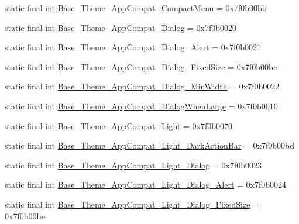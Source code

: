 \begin{CompactItemize}
\item 
static final int \hyperlink{classandroid_1_1support_1_1graphics_1_1drawable_1_1animated_1_1_r_1_1style_fb4b49c45164e8f37a20fc40da3d119b}{Base\_\-Theme\_\-AppCompat\_\-CompactMenu} = 0x7f0b00bb
\item 
static final int \hyperlink{classandroid_1_1support_1_1graphics_1_1drawable_1_1animated_1_1_r_1_1style_34fb42981b6fef358d1179c600223d95}{Base\_\-Theme\_\-AppCompat\_\-Dialog} = 0x7f0b0020
\item 
static final int \hyperlink{classandroid_1_1support_1_1graphics_1_1drawable_1_1animated_1_1_r_1_1style_d64f58d2f9e213f4c623315ff9ce6192}{Base\_\-Theme\_\-AppCompat\_\-Dialog\_\-Alert} = 0x7f0b0021
\item 
static final int \hyperlink{classandroid_1_1support_1_1graphics_1_1drawable_1_1animated_1_1_r_1_1style_555fdc8e07a40a5f3c76f8659857625c}{Base\_\-Theme\_\-AppCompat\_\-Dialog\_\-FixedSize} = 0x7f0b00bc
\item 
static final int \hyperlink{classandroid_1_1support_1_1graphics_1_1drawable_1_1animated_1_1_r_1_1style_8c5b459f6373c9dcb7fdc84ec3368818}{Base\_\-Theme\_\-AppCompat\_\-Dialog\_\-MinWidth} = 0x7f0b0022
\item 
static final int \hyperlink{classandroid_1_1support_1_1graphics_1_1drawable_1_1animated_1_1_r_1_1style_2ed606c106d326efef3dee70e122f57b}{Base\_\-Theme\_\-AppCompat\_\-DialogWhenLarge} = 0x7f0b0010
\item 
static final int \hyperlink{classandroid_1_1support_1_1graphics_1_1drawable_1_1animated_1_1_r_1_1style_244624537c3473127a52cf26da284d90}{Base\_\-Theme\_\-AppCompat\_\-Light} = 0x7f0b0070
\item 
static final int \hyperlink{classandroid_1_1support_1_1graphics_1_1drawable_1_1animated_1_1_r_1_1style_8981b5099de667919e3434dd29fb4237}{Base\_\-Theme\_\-AppCompat\_\-Light\_\-DarkActionBar} = 0x7f0b00bd
\item 
static final int \hyperlink{classandroid_1_1support_1_1graphics_1_1drawable_1_1animated_1_1_r_1_1style_02948f66f21ccaf3494d8cdc97dda1ca}{Base\_\-Theme\_\-AppCompat\_\-Light\_\-Dialog} = 0x7f0b0023
\item 
static final int \hyperlink{classandroid_1_1support_1_1graphics_1_1drawable_1_1animated_1_1_r_1_1style_24413b2463a7015ef5e592b8056c026e}{Base\_\-Theme\_\-AppCompat\_\-Light\_\-Dialog\_\-Alert} = 0x7f0b0024
\item 
static final int \hyperlink{classandroid_1_1support_1_1graphics_1_1drawable_1_1animated_1_1_r_1_1style_1bce4f66809ede68860fa13ff0c54dc5}{Base\_\-Theme\_\-AppCompat\_\-Light\_\-Dialog\_\-FixedSize} = 0x7f0b00be

\end{CompactItemize}
